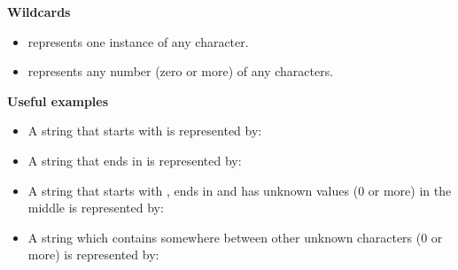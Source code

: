 \textbf{Wildcards}
\begin{itemize}
\item {} represents one instance of any character.
\item \bxshell{*} represents any number (zero or more) of any characters.  
\end{itemize}

\textbf{Useful examples}
\begin{itemize}
\item A string that starts with  is represented by: 
\item A string that ends in  is represented by: 
\item A string that starts with , ends in  and has unknown values (0 or more) in the middle is represented by: 
\item A string which contains  somewhere between other unknown characters (0 or more) is represented by: 
\end{itemize}
 
